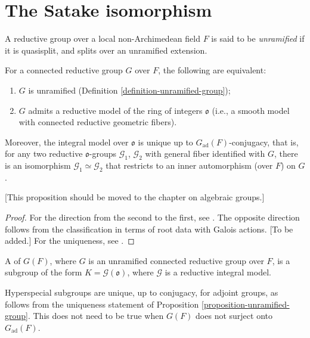 \section{The Satake isomorphism}
\label{section-Satake-isomorphism}


\begin{definition}
 \label{definition-unramified-group}
A reductive group over a local non-Archimedean field $F$ is said to be {\it unramified} if it is quasisplit, and splits over an unramified extension.
\end{definition}


\begin{proposition}
 \label{proposition-unramified-group}
For a connected reductive group $G$ over $F$, the following are equivalent:
\begin{enumerate}
 \item $G$ is unramified (Definition \ref{definition-unramified-group});
 \item $G$ admits a reductive model of the ring of integers $\mathfrak o$ (i.e., a smooth model with connected reductive geometric fibers).
\end{enumerate}
Moreover, the integral model over $\mathfrak o$ is unique up to $G_{\text{ad}}(F)$-conjugacy, that is, for any two reductive $\mathfrak o$-groups $\mathcal G_1$, $\mathcal G_2$ with general fiber identified with $G$, there is an isomorphism $\mathcal G_1 \simeq \mathcal G_2$ that restricts to an inner automorphism (over $F$) on $G$.
\end{proposition}

[This proposition should be moved to the chapter on algebraic groups.]

\begin{proof}
 For the direction from the second to the first, see \cite[Corollary 5.2.14]{Conrad-RGS}. The opposite direction follows from the classification in terms of root data with Galois actions. [To be added.] For the uniqueness, see \cite[Theorem 7.2.16]{Conrad-RGS}.
\end{proof}


\begin{definition}
 \label{definition-hyperspecial}
A  of $G(F)$, where $G$ is an unramified connected reductive group over $F$, is a subgroup of the form $K = \mathcal G (\mathfrak o)$, where $\mathcal G$ is a reductive integral model.
\end{definition}

Hyperspecial subgroups are unique, up to conjugacy, for adjoint groups, as follows from the uniqueness statement of Proposition \ref{proposition-unramified-group}. This does not need to be true when $G(F)$ does not surject onto $G_{\text{ad}}(F)$.


